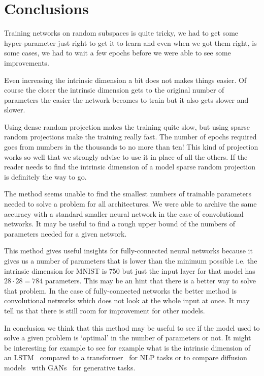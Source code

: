 \documentclass[twocolumn]{article}
\begin{document}
\section{Conclusions}
Training networks on random subspaces is quite tricky, we had to get some
hyper-parameter just right to get it to learn and even when we got them right,
is some cases, we had to wait a few epochs before we were able to see some
improvements.

Even increasing the intrinsic dimension a bit does not makes things easier. Of
course the closer the intrinsic dimension gets to the original number of
parameters the easier the network becomes to train but it also gets slower and
slower.

Using dense random projection makes the training quite slow, but using sparse
random projections make the training really fast. The number of epochs required
goes from numbers in the thousands to no more than ten! This kind of projection
works so well that we strongly advise to use it in place of all the others. If
the reader needs to find the intrinsic dimension of a model sparse random
projection is definitely the way to go.

The method seems unable to find the smallest numbers of trainable parameters
needed to solve a problem for all architectures. We were able to archive the
same accuracy with a standard smaller neural network in the case of
convolutional networks. It may be useful to find a rough upper bound of the
numbers of parameters needed for a given network.

This method gives useful insights for fully-connected neural networks because it
gives us a number of parameters that is lower than the minimum possible i.e. the
intrinsic dimension for MNIST is 750 but just the input layer for that model has
$28 \cdot 28 = 784$ parameters. This may be an hint that there is a better way
to solve that problem. In the case of fully-connected networks the better method
is convolutional networks which does not look at the whole input at once. It may
tell us that there is still room for improvement for other models.

In conclusion we think that this method may be useful to see if the model used
to solve a given problem is `optimal' in the number of parameters or not. It
might be interesting for example to see for example what is the intrinsic
dimension of an LSTM~\cite{lstm} compared to a transformer~\cite{trans} for NLP
tasks or to compare diffusion models~\cite{diffusion} with GANs~\cite{gan} for
generative
tasks.
\end{document}
